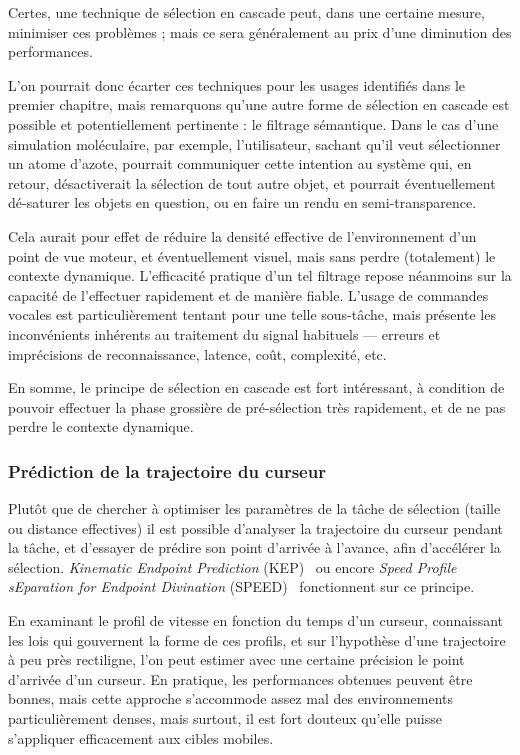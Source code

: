     Certes, une technique de sélection en cascade peut, dans une certaine mesure, minimiser ces problèmes ; mais ce sera généralement au prix d'une diminution des performances.
    
    L'on pourrait donc écarter ces techniques pour les usages identifiés dans le premier chapitre, mais remarquons qu'une autre forme de sélection en cascade est possible et potentiellement pertinente : le filtrage sémantique. Dans le cas d'une simulation moléculaire, par exemple, l'utilisateur, sachant qu'il veut sélectionner un atome d'azote, pourrait communiquer cette intention au système qui, en retour, désactiverait la sélection de tout autre objet, et pourrait éventuellement dé-saturer les objets en question, ou en faire un rendu en semi-transparence.
    
    Cela aurait pour effet de réduire la densité effective de l'environnement d'un point de vue moteur, et éventuellement visuel, mais sans perdre (totalement) le contexte dynamique. L'efficacité pratique d'un tel filtrage repose néanmoins sur la capacité de l'effectuer rapidement et de manière fiable. L'usage de commandes vocales est particulièrement tentant pour une telle sous-tâche, mais présente les inconvénients inhérents au traitement du signal habituels --- erreurs et imprécisions de reconnaissance, latence, coût, complexité, etc.
    
    En somme, le principe de sélection en cascade est fort intéressant, à condition de pouvoir effectuer la phase grossière de pré-sélection très rapidement, et de ne pas perdre le contexte dynamique.

	\subsubsection{Prédiction de la trajectoire du curseur}
    Plutôt que de chercher à optimiser les paramètres de la tâche de sélection (taille ou distance effectives) il est possible d'analyser la trajectoire du curseur pendant la tâche, et d'essayer de prédire son point d'arrivée à l'avance, afin d'accélérer la sélection. \emph{Kinematic Endpoint Prediction} (KEP)~\cite{lank2007endpoint} ou encore \emph{Speed Profile sEparation for Endpoint Divination} (SPEED)~\cite{wonner2011speed} fonctionnent sur ce principe.
    
    En examinant le profil de vitesse en fonction du temps d'un curseur, connaissant les lois qui gouvernent la forme de ces profils, et sur l'hypothèse d'une trajectoire à peu près rectiligne, l'on peut estimer avec une certaine précision le point d'arrivée d'un curseur. En pratique, les performances obtenues peuvent être bonnes, mais cette approche s'accommode assez mal des environnements particulièrement denses, mais surtout, il est fort douteux qu'elle puisse s'appliquer efficacement aux cibles mobiles.
    
